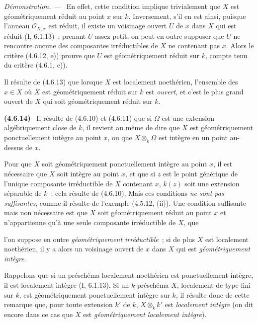 \documentclass[10pt,oneside]{book}
\newcommand{\oldpage}[2][]{%
  \setcounter{footnote}{0}%
  \marginpar{\scriptsize\textbf{#1}~|~#2}\ignorespaces}
\newenvironment{env}[1][]{\par\medskip\noindent\textbf{(#1)}\ }{\par}
\newenvironment{proof}{%
  \par\medskip\noindent\textit{Démonstration. ---\ }}{\par}
\begin{document}
\begin{proof}
En effet, cette condition implique trivialement que $X$ est géométriquement
réduit au point $x$ sur $k$. Inversement, s'il en est ainsi, puisque l'anneau
$\mathcal O_{X,x}$ est réduit, il existe un voisinage ouvert $U$ de $x$ dans
$X$ qui est réduit (I, 6.1.13)~; prenant $U$ assez petit, on peut en outre
supposer que $U$ ne rencontre aucune des composantes irréductibles de $X$ ne
contenant pas $x$. Alors le critère (4.6.12, e)) prouve que $U$ est
géométriquement réduit sur $k$, compte tenu du critère (4.6.1, e)).
\end{proof}

Il résulte de (4.6.13) que lorsque $X$ est localement noethérien, l'ensemble
des $x\in X$ où $X$ est géométriquement réduit sur $k$ est \emph{ouvert}, et
c'est le plus grand ouvert de $X$ qui soit géométriquement réduit sur $k$.

\begin{env}[4.6.14]
\label{IV.2.4.6.14-fr}
Il résulte de (4.6.10) et (4.6.11) que si $\Omega$ est une extension
algébriquement close de $k$, il revient au même de dire que $X$ est
géométriquement ponctuellement intègre au point $x$, ou que $X\otimes_k\Omega$
est intègre en un point au-dessus de $x$.

Pour que $X$ soit géométriquement ponctuellement intègre au point $x$, il est
nécessaire que $X$ soit intègre au point $x$, et que si $z$ est le point
générique de l'unique composante irréductible de $X$ contenant $x$, $k(z)$ soit
une extension séparable de $k$~; cela résulte de (4.6.10). Mais ces conditions
\emph{ne sont pas suffisantes}, comme il résulte de l'exemple (4.5.12, (ii)).
Une condition suffisante mais non nécessaire est que $X$ soit géométriquement
réduit au point $x$ et n'appartienne qu'à une seule composante irréductible de
$X$, que

\oldpage[IV-2]{72}

l'on suppose en outre \emph{géométriquement irréductible}~; si de plus $X$ est
localement noethérien, il y a alors un voisinage ouvert de $x$ dans $X$ qui est
\emph{géométriquement intègre}.
\end{env}

Rappelons que si un préschéma localement noethérien est ponctuellement intègre,
il est localement intègre (I, 6.1.13). Si un $k$-préschéma $X$, localement de
type fini sur $k$, est géométriquement ponctuellement intègre sur $k$, il
résulte donc de cette remarque que, pour toute extension $k'$ de $k$,
$X\otimes_k k'$ est \emph{localement intègre} (on dit encore dans ce cas que
$X$ est \emph{géométriquement localement intègre}).
\end{document}
